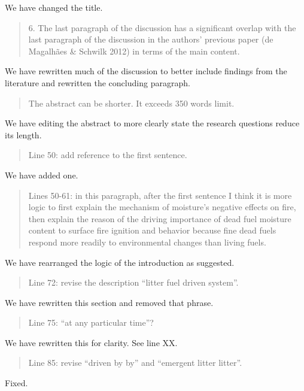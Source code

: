 \documentclass[letterpaper, 12pt]{letter}
\begin{document}
\begin{letter}{}
We have changed the title.

\begin{quote}
  6. The last paragraph of the discussion has a significant overlap with the
  last paragraph of the discussion in the authors’ previous paper (de Magalhães
  \& Schwilk 2012) in terms of the main content.
\end{quote}

We have rewritten much of the discussion to better include findings from the
literature and rewritten the concluding paragraph.

\begin{quote}
The abstract can be shorter. It exceeds 350 words limit. 
\end{quote}

We have editing the abstract to more clearly state the research questions
reduce its length.

\begin{quote}
Line 50: add reference to the first sentence.
\end{quote}

We have added one.

\begin{quote}
  Lines 50-61: in this paragraph, after the first sentence I think it is more
  logic to first explain the mechanism of moisture’s negative effects on fire,
  then explain the reason of the driving importance of dead fuel moisture
  content to surface fire ignition and behavior because fine dead fuels respond
  more readily to environmental changes than living fuels.
\end{quote}

We have rearranged the logic of the introduction as suggested.

\begin{quote}
Line 72: revise the description ``litter fuel driven system''.
\end{quote}

We have rewritten this section and removed that phrase.

\begin{quote}
Line 75: “at any particular time”?
\end{quote}

We have rewritten this for clarity. See line XX.

\begin{quote}
Line 85: revise ``driven by by'' and ``emergent litter litter''.
\end{quote}

Fixed.


\end{letter}
\end{document}

